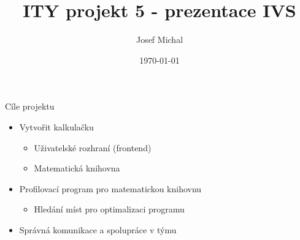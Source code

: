 \documentclass[fleqn]{beamer}
\title{ITY projekt 5 - prezentace IVS}
\author{Josef Michal}
\date{\today}
\begin{document}
\frame{\titlepage}

\begin{frame}{Cíle projektu}
\begin{itemize}
    \item Vytvořit kalkulačku
    \pause
    \begin{itemize}
        \item Uživatelské rozhraní (frontend)
        \item Matematická knihovna
    \pause
    \end{itemize}
    \item Profilovací program pro matematickou knihovnu
    \pause
    \begin{itemize}
        \item Hledání míst pro optimalizaci programu
    \end{itemize}
    \pause
    \item Správná komunikace a spolupráce v týmu
\end{itemize}
\end{frame}
\end{document}
